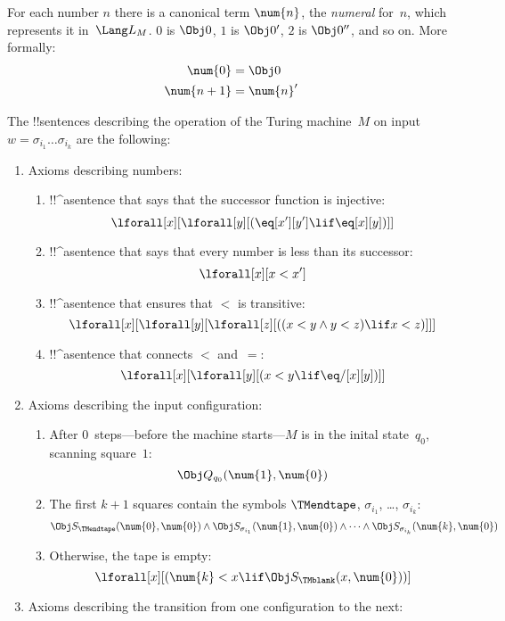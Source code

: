 \documentclass[../../../include/open-logic-section]{subfiles}
\begin{document}
For each number $n$ there is a canonical term $\num{n}$, the
\emph{numeral} for~$n$, which represents it in~$\Lang L_M$. $\num{0}$
is $\Obj 0$, $\num{1}$ is $\Obj 0'$, $\num{2}$ is $\Obj 0''$, and so
on. More formally:
\begin{align*}
\num{0} & = \Obj 0 \\
\num{n+1} &= \num{n}'
\end{align*}

The !!{sentence}s describing the operation of the Turing machine~$M$ on
input $w = \sigma_{i_1}\dots\sigma_{i_k}$ are the following:
\begin{enumerate}
\item Axioms describing numbers:
\begin{enumerate}
\item {} !!^a{sentence} that says that the successor function is injective:
\[
\lforall[x][\lforall[y][
    (\eq[x'][y'] \lif \eq[x][y])]]
\]
\item !!^a{sentence} that says that every number is less than its successor:
\[
\lforall[x][x < x']
\]
\item !!^a{sentence} that ensures that $<$ is transitive:
\[
\lforall[x][\lforall[y][\lforall[z][
      ((x < y \land y < z) \lif x < z)]]]
\]
\item !!^a{sentence} that connects $<$ and~$=$:
\[
\lforall[x][\lforall[y][(x < y \lif \eq/[x][y])]]
\]
\end{enumerate}
\item Axioms describing the input configuration:
\begin{enumerate}
\item After $0$~steps---before the machine starts---$M$ is in
  the inital state~$q_0$, scanning square~$1$:
\[
\Obj Q_{q_0}(\num{1}, \num{0})
\]
\item The first $k+1$ squares contain the symbols $\TMendtape$,
  $\sigma_{i_1}$, \dots, $\sigma_{i_k}$:
\[
\Obj S_\TMendtape(\num{0}, \num{0}) \land
\Obj S_{\sigma_{i_1}}(\num{1}, \num{0}) \land
\dots \land
\Obj S_{\sigma_{i_k}}(\num{k}, \num{0})
\]
\item Otherwise, the tape is empty:
\[
\lforall[x][(\num{k} < x \lif \Obj S_\TMblank(x, \num{0}))]
\]
\end{enumerate}
\item Axioms describing the transition from one configuration to
  the next:


\end{enumerate}
\end{document}
